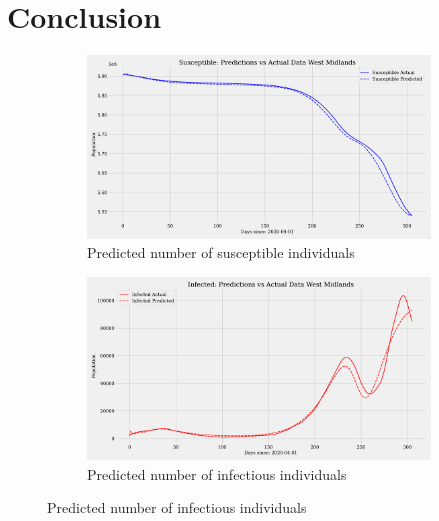 \documentclass[12pt]{article}
\begin{document}
\section{Conclusion}





\begin{figure}[h]
    \centering
    \begin{subfigure}[t]{0.45\textwidth}
        \includegraphics[width=\textwidth]{images/pinn/S_predictions_West Midlands.pdf}
        \caption{Predicted number of susceptible individuals}
        \label{fig:S_predictions_West Midlands}
    \end{subfigure}
    \hfill %
    \begin{subfigure}[t]{0.45\textwidth}
        \includegraphics[width=\textwidth]{images/pinn/I_predictions_West Midlands.pdf}
        \caption{Predicted number of infectious individuals}
        \label{fig:I_predictions_West Midlands}
    \end{subfigure}

    \vspace{0.5cm}


\end{figure}
\end{document}
